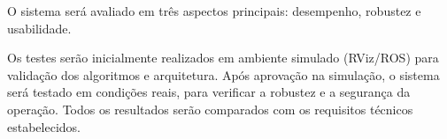 O sistema será avaliado em três aspectos principais: desempenho, robustez e usabilidade. 
 

Os testes serão inicialmente realizados em ambiente simulado (RViz/ROS) para validação dos algoritmos e arquitetura. Após aprovação na simulação, o sistema será testado em condições reais, para verificar a robustez e a segurança da operação. Todos os resultados serão comparados com os requisitos técnicos estabelecidos.

